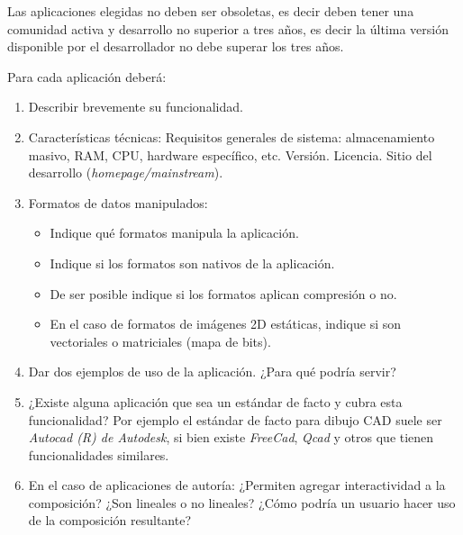 \documentclass[12pt]{article}
\begin{document}
Las aplicaciones elegidas no deben ser obsoletas, es decir deben tener una
comunidad activa y desarrollo no superior a tres años, es decir la última
versión disponible por el desarrollador no debe superar los tres años.

Para cada aplicación deberá:

\begin{enumerate}

    \item Describir brevemente su funcionalidad.

    \item Características técnicas: Requisitos generales de sistema:
    almacenamiento masivo, RAM, CPU, hardware específico, etc. Versión.
    Licencia. Sitio del desarrollo (\emph{homepage/mainstream}).

    \item Formatos de datos manipulados:

    \begin{itemize}

        \item Indique qué formatos manipula la aplicación.

        \item Indique si los formatos son nativos de la aplicación.

        \item De ser posible indique si los formatos aplican compresión o no.

        \item En el caso de formatos de imágenes 2D estáticas, indique si son
            vectoriales o matriciales (mapa de bits).


    \end{itemize}

    \item Dar dos ejemplos de uso de la aplicación. ¿Para qué podría servir?

    \item ¿Existe alguna aplicación que sea un estándar de facto y cubra esta
    funcionalidad? Por ejemplo el estándar de facto para dibujo CAD suele ser
    \emph{Autocad (R) de Autodesk}, si bien existe \emph{FreeCad}, \emph{Qcad}
    y otros que tienen funcionalidades similares.

    \item En el caso de aplicaciones de autoría: ¿Permiten agregar
    interactividad a la composición? ¿Son lineales o no lineales? ¿Cómo podría
    un usuario hacer uso de la composición resultante?

\end{enumerate}
\end{document}
